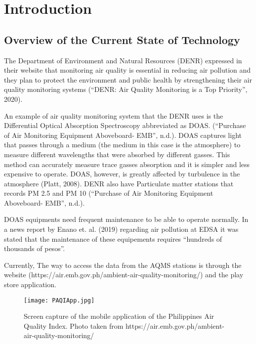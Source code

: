 \chapter{Introduction}
\label{sec:researchdesc}    %

\section{Overview of the Current State of Technology}
\label{sec:overview}
The Department of Environment and Natural Resources (DENR) expressed in their website that monitoring air quality is essential in reducing air pollution and they plan to protect the environment and public health by strengthening their air quality monitoring systems (“DENR: Air Quality Monitoring is a Top Priority”, 2020).

An example of air quality monitoring system that the DENR uses is the Differential Optical Absorption Spectroscopy abbreviated as DOAS. (“Purchase of Air Monitoring Equipment Aboveboard- EMB”, n.d.). DOAS captures light that passes through a medium (the medium in this case is the atmosphere) to measure different wavelengths that were absorbed by different gasses. This method can accurately measure trace gasses absorption and it is simpler and less expensive to operate. DOAS, however, is greatly affected by turbulence in the atmosphere (Platt, 2008). DENR also have Particulate matter stations that records PM 2.5 and PM 10 (“Purchase of Air Monitoring Equipment Aboveboard- EMB”, n.d.).

DOAS equipments need frequent maintenance to be able to operate normally. In a news report by Enano et. al. (2019) regarding air pollution at EDSA it was stated that the maintenance of these equipements requires “hundreds of thousands of pesos”.

Currently, The way to access the data from the AQMS stations is through the website (https://air.emb.gov.ph/ambient-air-quality-monitoring/) and the play store application.

  
\begin{figure}[t]                %
   \centering                    %
   \texttt{[image: PAQIApp.jpg]}      %
   \caption{Screen capture of the mobile application of the Philippines Air Quality Index. Photo taken from https://air.emb.gov.ph/ambient-air-quality-monitoring/ 
}
    \label{fig:PAQIApp}
\end{figure}


